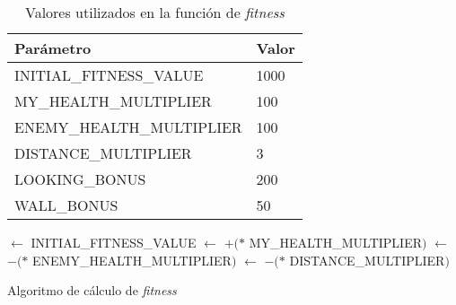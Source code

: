 \begin{table}
	\begin{center}
		\begin{tabular}{|l|l|}
			\hline
			\textbf{Parámetro} & \textbf{Valor}\\
			
			\hline
			INITIAL\_FITNESS\_VALUE& 1000\\
			
			\hline
			MY\_HEALTH\_MULTIPLIER& 100\\
			
			\hline
			ENEMY\_HEALTH\_MULTIPLIER& 100\\
			
			\hline
			DISTANCE\_MULTIPLIER& 3\\
			
			\hline
			LOOKING\_BONUS& 200\\
			
			\hline
			WALL\_BONUS& 50\\
			
			\hline
		\end{tabular}
		\caption{Valores utilizados en la función de \textit{fitness}}
		\label{algoritmo:valores}
	\end{center}
\end{table}


\begin{algorithm}
	
	
	
	\Input{\PlayerHealth, \EnemyHealth, \Distance, \LookingAtEnemy, \NoWallsNear}
	\Output{\Fitness}
		
		
		\Fitness$\leftarrow$ INITIAL\_FITNESS\_VALUE\;
		\Fitness$\leftarrow$ \Fitness$+ ($\PlayerHealth$*$ MY\_HEALTH\_MULTIPLIER$)$\;
		\Fitness$\leftarrow$ \Fitness$- ($\EnemyHealth$*$ ENEMY\_HEALTH\_MULTIPLIER$)$\;
		\Fitness$\leftarrow$ \Fitness$- ($\Distance$*$ DISTANCE\_MULTIPLIER$)$\;
		
	

	\caption{Algoritmo de cálculo de \textit{fitness}}
	\label{algoritmo:fitness}
\end{algorithm}

